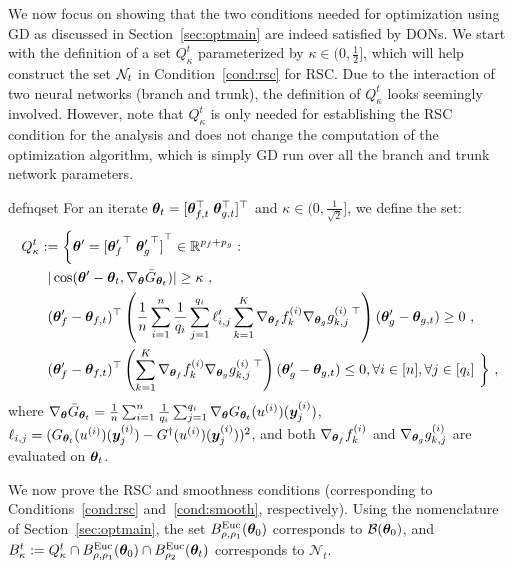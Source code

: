 We now focus on showing that the two conditions needed for optimization using GD as discussed in Section~\ref{sec:optmain} are indeed satisfied by DONs. We start with the definition of a set $Q^t_{\kappa}$ parameterized by $\kappa \in (0, \frac{1}{2}]$, which will help construct the set ${\cal N}_t$ in Condition~\ref{cond:rsc} for RSC. Due to the interaction of two neural networks (branch and trunk), the definition of $Q^t_{\kappa}$ looks seemingly involved. However, note that $Q^t_{\kappa}$ is only needed for establishing the RSC condition for the analysis and does not change the computation of the optimization algorithm, which is simply GD run over all the branch and trunk network parameters. 
%
%
\begin{restatable}{defn}{qset} 
%
For an iterate ${\bm{\theta}}_t = [{\bm{\theta}}_{f,t}^{\top}\; {\bm{\theta}}_{g,t}^{\top}]^{\top}$ and $\kappa \in (0,\frac{1}{\sqrt{2}}]$, we define the set:
{\small 
\begin{equation}
    \begin{aligned} 
Q^t_{\kappa} &:= \bigg\{ \vtheta' = {[{\vtheta'_{f}}^{\top}\; {\vtheta'_{g}}^{\top}]}^{\top}\in \R^{p_f+p_g}:\\
&\;\;|\cos(\vtheta' - \vtheta_t, \nabla_{\vtheta} \bar{G}_{\vtheta_t})| \geq \kappa~, \\
%
&\;\;(\vtheta'_f-\vtheta_{f,t})^\top\left(\frac{1}{n} \sum_{i=1}^n \frac{1}{q_i} \sum_{j=1}^{q_i} \ell'_{i,j} \sum_{k=1}^K \nabla_{\vtheta_{f}} f_k^{(i)} \nabla_{\vtheta_{g}} g_{k,j}^{(i)~\top}\right)(\vtheta'_g-\vtheta_{g,t})  \geq 0~,\\
&\;\;(\vtheta'_f-\vtheta_{f,t})^\top\left( \sum_{k=1}^K \nabla_{\vtheta_{f}} f_k^{(i)} \nabla_{\vtheta_{g}} g_{k,j}^{(i)~\top}\right)(\vtheta'_g-\vtheta_{g,t})\leq 0,\forall i\in[n],\forall j\in[q_i] ~ \bigg\}~,
    \end{aligned}
\label{defn:qset}
\end{equation}}where $\nabla_{{\bm{\theta}}}\bar{G}_{{\bm{\theta}}_t} = \frac{1}{n} \sum_{i=1}^n \frac{1}{q_i} \sum_{j=1}^{q_i} \nabla_{{\bm{\theta}}}G_{{\bm{\theta}}_t}(u^{(i)})({\bm{y}}^{(i)}_j)$, $\ell_{i,j}=(G_{{\bm{\theta}}_t}(u^{(i)})({\bm{y}}_{j}^{(i)})-G^\dagger(u^{(i)})({\bm{y}}^{(i)}_j))^2$, and both $\nabla_{{\bm{\theta}}_{f}}f^{(i)}_k$ and $\nabla_{{\bm{\theta}}_{g}}g^{(i)}_{k,j}$ are evaluated on ${\bm{\theta}}_t$.
\label{defn:qset_DON}
\end{restatable}

We now prove the RSC and smoothness conditions (corresponding to Conditions~\ref{cond:rsc} and~\ref{cond:smooth}, respectively).
Using the nomenclature of Section~\ref{sec:optmain}, the set $B^{\mathrm{Euc}}_{\rho,\rho_1}({\bm{\theta}}_0)$ corresponds to $\mathcal{B}({\bm{\theta}}_0)$, and 
$B^t_{\kappa} := Q_{\kappa}^t \cap B^{\mathrm{Euc}}_{\rho,\rho_1}({\bm{\theta}}_0) \cap B^{\mathrm{Euc}}_{\rho_2}({\bm{\theta}}_t)$ corresponds to $\mathcal{N}_t$.
%
%

